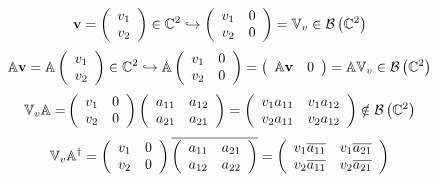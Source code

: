 \documentclass[aps,preprint]{revtex4}%
\begin{document}
\begin{equation}
\mathbf{v}=\left(
\begin{array}
[c]{c}%
v_{1}\\
v_{2}%
\end{array}
\right)  \in\mathbb{C}^{2}\hookrightarrow\left(
\begin{array}
[c]{cc}%
v_{1} & 0\\
v_{2} & 0
\end{array}
\right)  =\mathbb{V}_{v}\in\mathcal{B}\left(  \mathbb{C}^{2}\right)
\end{equation}%
\begin{equation}
\mathbb{A}\mathbf{v}=\mathbb{A}\left(
\begin{array}
[c]{c}%
v_{1}\\
v_{2}%
\end{array}
\right)  \in\mathbb{C}^{2}\hookrightarrow\mathbb{A}\left(
\begin{array}
[c]{cc}%
v_{1} & 0\\
v_{2} & 0
\end{array}
\right)  =\left(
\begin{array}
[c]{cc}%
\mathbb{A}\mathbf{v} & 0
\end{array}
\right)  =\mathbb{AV}_{v}\in\mathcal{B}\left(  \mathbb{C}^{2}\right)
\end{equation}%
\begin{equation}
\mathbb{V}_{v}\mathbb{A=}\left(
\begin{array}
[c]{cc}%
v_{1} & 0\\
v_{2} & 0
\end{array}
\right)  \left(
\begin{array}
[c]{cc}%
a_{11} & a_{12}\\
a_{21} & a_{21}%
\end{array}
\right)  =\left(
\begin{array}
[c]{cc}%
v_{1}a_{11} & v_{1}a_{12}\\
v_{2}a_{11} & v_{2}a_{12}%
\end{array}
\right)  \notin\mathcal{B}\left(  \mathbb{C}^{2}\right)
\end{equation}%
\begin{equation}
\mathbb{V}_{v}\mathbb{A}^{\dagger}=\left(
\begin{array}
[c]{cc}%
v_{1} & 0\\
v_{2} & 0
\end{array}
\right)  \overline{\left(
\begin{array}
[c]{cc}%
a_{11} & a_{21}\\
a_{12} & a_{22}%
\end{array}
\right)  }=\left(
\begin{array}
[c]{cc}%
v_{1}\overline{a_{11}} & v_{1}\overline{a_{21}}\\
v_{2}\overline{a_{11}} & v_{2}\overline{a_{21}}%
\end{array}
\right)
\end{equation}%
\end{document}
